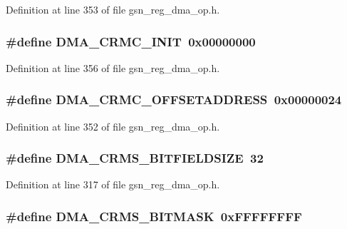 Definition at line 353 of file gsn\_\-reg\_\-dma\_\-op.h.

\hypertarget{a00547_a3251d4d44ab7778d9bffcf0a89156981}{
\subsubsection[{DMA\_\-CRMC\_\-INIT}]{\setlength{\rightskip}{0pt plus 5cm}\#define DMA\_\-CRMC\_\-INIT~0x00000000}}
\label{a00547_a3251d4d44ab7778d9bffcf0a89156981}


Definition at line 356 of file gsn\_\-reg\_\-dma\_\-op.h.

\hypertarget{a00547_ab593331124f5415f59ad68c3ae690b64}{
\subsubsection[{DMA\_\-CRMC\_\-OFFSETADDRESS}]{\setlength{\rightskip}{0pt plus 5cm}\#define DMA\_\-CRMC\_\-OFFSETADDRESS~0x00000024}}
\label{a00547_ab593331124f5415f59ad68c3ae690b64}


Definition at line 352 of file gsn\_\-reg\_\-dma\_\-op.h.

\hypertarget{a00547_a2e7e27db7c47366e6c23b0c3d98e7426}{
\subsubsection[{DMA\_\-CRMS\_\-BITFIELDSIZE}]{\setlength{\rightskip}{0pt plus 5cm}\#define DMA\_\-CRMS\_\-BITFIELDSIZE~32}}
\label{a00547_a2e7e27db7c47366e6c23b0c3d98e7426}


Definition at line 317 of file gsn\_\-reg\_\-dma\_\-op.h.

\hypertarget{a00547_a3caa1ec0922839b9befe7c804a7a4e7b}{
\subsubsection[{DMA\_\-CRMS\_\-BITMASK}]{\setlength{\rightskip}{0pt plus 5cm}\#define DMA\_\-CRMS\_\-BITMASK~0xFFFFFFFF}}
\label{a00547_a3caa1ec0922839b9befe7c804a7a4e7b}


